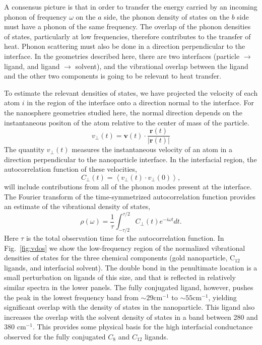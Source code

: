 \documentclass[aps,jcp,preprint,showpacs,superscriptaddress,groupedaddress]{revtex4-1}  %
\begin{document}
A consensus picture is that in order to transfer the energy carried by
an incoming phonon of frequency $\omega$ on the $a$ side, the phonon
density of states on the $b$ side must have a phonon of the same
frequency. The overlap of the phonon densities of states, particularly
at low frequencies, therefore contributes to the transfer of heat.
Phonon scattering must also be done in a direction perpendicular to
the interface.  In the geometries described here, there are two
interfaces (particle $\rightarrow$ ligand, and ligand $\rightarrow$
solvent), and the vibrational overlap between the ligand and the other
two components is going to be relevant to heat transfer.
 
To estimate the relevant densities of states, we have projected the
velocity of each atom $i$ in the region of the interface onto a
direction normal to the interface. For the nanosphere geometries
studied here, the normal direction depends on the instantaneous
positon of the atom relative to the center of mass of the particle.
\begin{equation}
v_\perp(t) = \mathbf{v}(t) \cdot \frac{\mathbf{r}(t)}{\left|\mathbf{r}(t)\right|}
\end{equation}
The quantity $v_\perp(t)$ measures the instantaneous velocity of an
atom in a direction perpendicular to the nanoparticle interface.  In
the interfacial region, the autocorrelation function of these
velocities,
\begin{equation}
  C_\perp(t) = \left< v_\perp(t) \cdot v_\perp(0) \right>,
\end{equation}
will include contributions from all of the phonon modes present at the
interface.  The Fourier transform of the time-symmetrized
autocorrelation function provides an estimate of the vibrational
density of states,\cite{Shin:2010sf}
\begin{equation}
  \rho(\omega) = \frac{1}{\tau} \int_{-\tau/2}^{\tau/2} C_\perp(t) e^{-i
    \omega t} dt.
\end{equation}
Here $\tau$ is the total observation time for the autocorrelation
function.  In Fig.~\ref{fig:vdos} we show the low-frequency region of
the normalized vibrational densities of states for the three chemical
components (gold nanoparticle, C$_{12}$ ligands, and interfacial
solvent).  The double bond in the penultimate location is a small
perturbation on ligands of this size, and that is reflected in
relatively similar spectra in the lower panels.  The fully conjugated
ligand, however, pushes the peak in the lowest frequency band from
$\sim 29 \mathrm{cm}^{-1}$ to $\sim 55 \mathrm{cm}^{-1}$, yielding
significant overlap with the density of states in the nanoparticle.
This ligand also increases the overlap with the solvent density of
states in a band between 280 and 380 $\mathrm{cm}^{-1}$.  This
provides some physical basis for the high interfacial conductance
observed for the fully conjugated $C_8$ and $C_{12}$ ligands.
\end{document}
